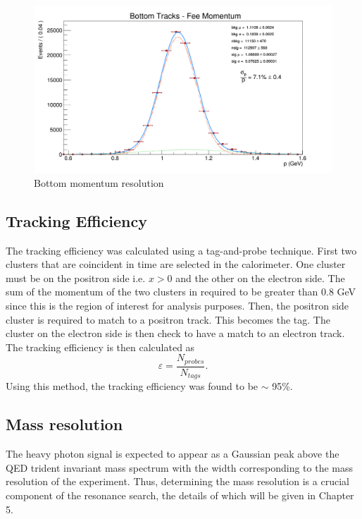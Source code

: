 \begin{figure}[h!b]
    \centering
    \includegraphics[width=.95\textwidth]{images/20160424_fee_bottom_tracks_p.png}
    \caption{Bottom momentum resolution}
    \label{fig:bot_p}
\end{figure}

\subsection{Tracking Efficiency}

The tracking efficiency was calculated using a tag-and-probe technique.  First
two clusters that are coincident in time are selected in the calorimeter. One
cluster must be on the positron side i.e. $x > 0$ and the other on the electron
side.  The sum of the momentum of the two clusters in required to be greater 
than 0.8 GeV since this is the region of interest for analysis purposes. Then, 
the positron side cluster is required to match to a positron track.  This 
becomes the tag.  The cluster on the electron side is then check to have a 
match to an electron track.  The tracking efficiency is then calculated as 
\begin{equation}
    \varepsilon = \frac{N_{probes}}{N_{tags}}.
\end{equation}
Using this method, the tracking efficiency was found to be $\sim$ 95\%. 

\subsection{Mass resolution}

The heavy photon signal is expected to appear as a Gaussian peak above the QED 
trident invariant mass spectrum with the width corresponding to the mass 
resolution of the experiment.  Thus, determining the mass resolution is a crucial
component of the resonance search, the details of which will be given in Chapter 5.

